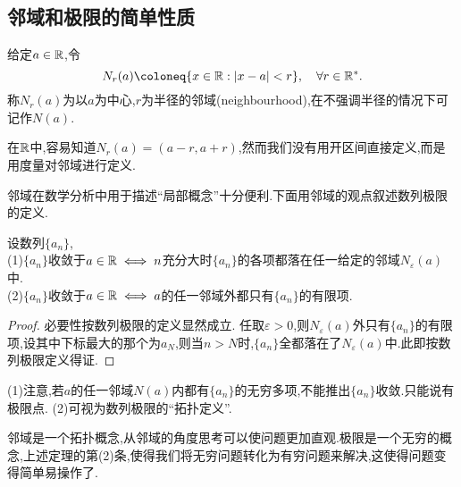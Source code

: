 \subsection{邻域和极限的简单性质}
\begin{definition}[邻域]
    给定$a\in\mathbb{R}$,令
    \[N_r(a)\coloneq\{x\in\R:|x-a|<r\},\quad \forall r\in \R^*.\]
    称$N_r(a)$为以$a$为中心,$r$为半径的邻域(neighbourhood),在不强调半径的情况下可记作$N(a)$.
\end{definition}

\begin{remark}
    在$\mathbb{R}$中,容易知道$N_r(a)=(a-r,a+r)$,然而我们没有用开区间直接定义,而是用度量对邻域进行定义.
\end{remark}

邻域在数学分析中用于描述“局部概念”十分便利.下面用邻域的观点叙述数列极限的定义.

\begin{theorem}
    设数列$\{a_n\}$,\\
    (1)$\{a_n\}$收敛于$a\in\mathbb{R}\iff n$充分大时$\{a_n\}$的各项都落在任一给定的邻域$N_{\varepsilon}(a)$中.\\
    (2)$\{a_n\}$收敛于$a\in\mathbb{R}\iff a$的任一邻域外都只有$\{a_n\}$的有限项.
\end{theorem}

\begin{proof}
    必要性按数列极限的定义显然成立.
    任取$\varepsilon>0$,则$N_{\varepsilon}(a)$外只有$\{a_n\}$的有限项,设其中下标最大的那个为$a_N$,则当$n>N$时,$\{a_n\}$全都落在了$N_{\varepsilon}(a)$中.此即按数列极限定义得证.
\end{proof}

\begin{remark}
    (1)注意,若$a$的任一邻域$N(a)$内都有$\{a_n\}$的无穷多项,不能推出$\{a_n\}$收敛.只能说有极限点.
    (2)可视为数列极限的“拓扑定义”.
\end{remark}

邻域是一个拓扑概念,从邻域的角度思考可以使问题更加直观.极限是一个无穷的概念,上述定理的第(2)条,使得我们将无穷问题转化为有穷问题来解决,这使得问题变得简单易操作了.